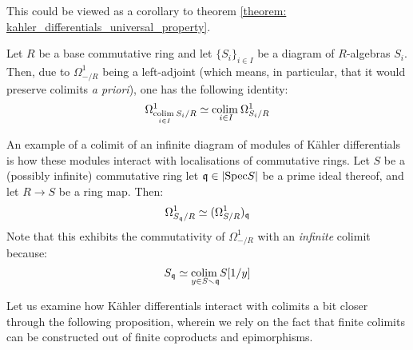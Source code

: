             \begin{remark} \label{remark: differentials_and_colimits}
                This could be viewed as a corollary to theorem \ref{theorem: kahler_differentials_universal_property}. 
                
                Let $R$ be a base commutative ring and let $\{S_i\}_{i \in I}$ be a diagram of $R$-algebras $S_i$. Then, due to $\Omega^1_{-/R}$ being a left-adjoint (which means, in particular, that it would preserve colimits \textit{a priori}), one has the following identity:
                    $$\Omega^1_{\underset{i \in I}{\operatorname{colim} \:} S_i/R} \simeq \underset{i \in I}{\operatorname{colim} \:} \Omega^1_{S_i/R}$$
            \end{remark}
            \begin{example} \label{example: differentials_and_localisations}
                An example of a colimit of an infinite diagram of modules of K\"ahler differentials is how these modules interact with localisations of commutative rings. Let $S$ be a (possibly infinite) commutative ring let $\mathfrak{q} \in |\mathrm{Spec} S|$ be a prime ideal thereof, and let $R \to S$ be a ring map. Then:
                    $$\Omega^1_{S_{\mathfrak{q}}/R} \simeq (\Omega^1_{S/R})_{\mathfrak{q}}$$
                Note that this exhibits the commutativity of $\Omega^1_{-/R}$ with an \textit{infinite} colimit because:
                    $$S_{\mathfrak{q}} \simeq \underset{y \in S \smallsetminus \mathfrak{q}}{\operatorname{colim} \:} S[1/y]$$
            \end{example}
            Let us examine how K\"ahler differentials interact with colimits a bit closer through the following proposition, wherein we rely on the fact that finite colimits can be constructed out of finite coproducts and epimorphisms.
